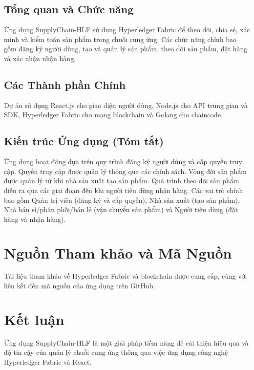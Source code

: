 \documentclass[a4paper,12pt]{article}
\begin{document}
\subsection{Tổng quan và Chức năng}

Ứng dụng SupplyChain-HLF sử dụng Hyperledger Fabric để theo dõi, chia sẻ, xác minh và kiểm toán sản phẩm trong chuỗi cung ứng. Các chức năng chính bao gồm đăng ký người dùng, tạo và quản lý sản phẩm, theo dõi sản phẩm, đặt hàng và xác nhận nhận hàng.

\subsection{Các Thành phần Chính}

Dự án sử dụng React.js cho giao diện người dùng, Node.js cho API trung gian và SDK, Hyperledger Fabric cho mạng blockchain và Golang cho chaincode.

\subsection{Kiến trúc Ứng dụng (Tóm tắt)}

Ứng dụng hoạt động dựa trên quy trình đăng ký người dùng và cấp quyền truy cập. Quyền truy cập được quản lý thông qua các chính sách. Vòng đời sản phẩm được quản lý từ khi nhà sản xuất tạo sản phẩm. Quá trình theo dõi sản phẩm diễn ra qua các giai đoạn đến khi người tiêu dùng nhận hàng. Các vai trò chính bao gồm Quản trị viên (đăng ký và cấp quyền), Nhà sản xuất (tạo sản phẩm), Nhà bán sỉ/phân phối/bán lẻ (vận chuyển sản phẩm) và Người tiêu dùng (đặt hàng và nhận hàng).

\section{Nguồn Tham khảo và Mã Nguồn}

Tài liệu tham khảo về Hyperledger Fabric và blockchain được cung cấp, cùng với liên kết đến mã nguồn của ứng dụng trên GitHub.

\section{Kết luận}

Ứng dụng SupplyChain-HLF là một giải pháp tiềm năng để cải thiện hiệu quả và độ tin cậy của quản lý chuỗi cung ứng thông qua việc ứng dụng công nghệ Hyperledger Fabric và React.
\end{document}
